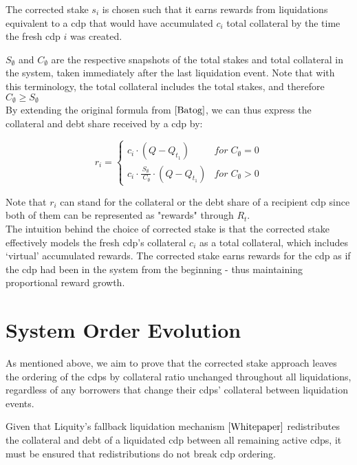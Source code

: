 \documentclass[reqno]{article}
\begin{document}
\bigskip
The corrected stake $s_i$ is chosen such that it earns rewards from liquidations equivalent to a cdp that would have accumulated $c_i$ total collateral by the time the fresh cdp $i$ was created.
 
$S_\emptyset$ and $C_\emptyset$ are the respective snapshots of the total stakes and total collateral in the system, taken immediately after the last liquidation event. Note that with this terminology, the total collateral includes the total stakes, and therefore $C_\emptyset \ge S_\emptyset$
\\

By extending the original formula from $\cite{Batog}$, we can thus express the collateral and debt share received by a cdp by:

\begin{equation}
    r_i=
        \begin{cases} 
            c_i \cdot (Q - Q_{t_1}) & for \;C_\emptyset = 0\\
            c_i \cdot \frac{S_\emptyset} {\;C_\emptyset} \cdot (Q - Q_{t_1}) & for \;C_\emptyset>0
        \end{cases}
\end{equation}

Note that $r_i$ can stand for the collateral or the debt share of a recipient cdp since both of them can be represented as "rewards" through $R_t$. \\

The intuition behind the choice of corrected stake is that the corrected stake effectively models the fresh cdp’s collateral $c_i$ as a total collateral, which includes ‘virtual’ accumulated rewards. The corrected stake earns rewards for the cdp as if the cdp had been in the system from the beginning - thus maintaining proportional reward growth.\\

\section{System Order Evolution}

As mentioned above, we aim to prove that the corrected stake approach leaves the ordering of the cdps by collateral ratio unchanged throughout all liquidations, regardless of any borrowers that change their cdps' collateral between liquidation events.

Given that Liquity's fallback liquidation mechanism $\cite{Whitepaper}$ redistributes the collateral and debt of a liquidated cdp between all remaining active cdps, it must be  ensured that redistributions do not break cdp ordering.
\end{document}
